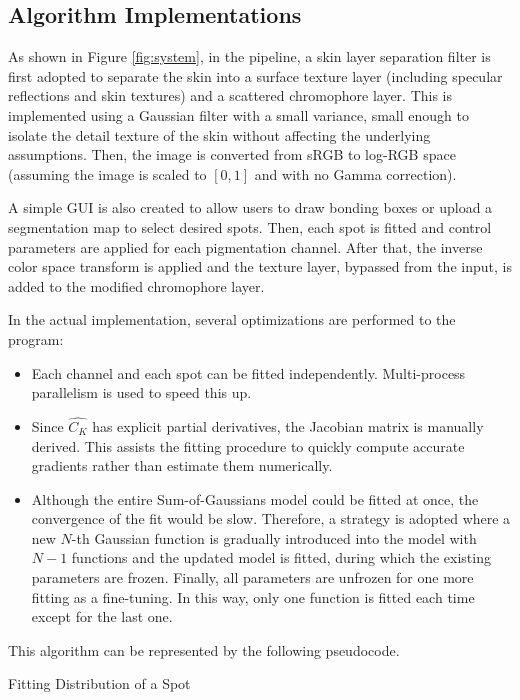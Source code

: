 \begin{spacing}{1.5}
\subsection{Algorithm Implementations}

As shown in Figure \ref{fig:system}, in the pipeline, a skin layer separation filter is first adopted to separate the skin into a surface texture layer (including specular reflections and skin textures) and a scattered chromophore layer. This is implemented using a Gaussian filter with a small variance, small enough to isolate the detail texture of the skin without affecting the underlying assumptions. Then, the image is converted from sRGB to log-RGB space (assuming the image is scaled to $[0,1]$ and with no Gamma correction).

A simple GUI is also created to allow users to draw bonding boxes or upload a segmentation map to select desired spots. Then, each spot is fitted and control parameters are applied for each pigmentation channel. After that, the inverse color space transform is applied and the texture layer, bypassed from the input, is added to the modified chromophore layer.

In the actual implementation, several optimizations are performed to the program:
\begin{itemize}
    \item Each channel and each spot can be fitted independently. Multi-process parallelism is used to speed this up.
    \item Since $\hat{C_K}$ has explicit partial derivatives, the Jacobian matrix is manually derived. This assists the fitting procedure to quickly compute accurate gradients rather than estimate them numerically.
    \item Although the entire Sum-of-Gaussians model could be fitted at once, the convergence of the fit would be slow. Therefore, a strategy is adopted where a new $N$-th Gaussian function is gradually introduced into the model with $N-1$ functions and the updated model is fitted, during which the existing parameters are frozen. Finally, all parameters are unfrozen for one more fitting as a fine-tuning. In this way, only one function is fitted each time except for the last one.
\end{itemize}

This algorithm can be represented by the following pseudocode.
\begin{algorithm}
    \caption{Fitting Distribution of a Spot}
    \begin{algorithmic}[1]
    

\end{algorithmic}
\end{algorithm}
\end{spacing}

